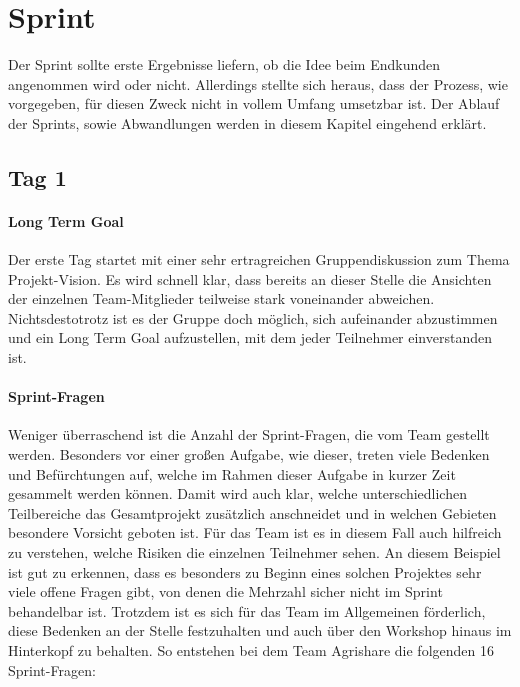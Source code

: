 \section{Sprint}
\label{sec:Sprint-Umsetzung}
Der Sprint sollte erste Ergebnisse liefern, ob die Idee beim Endkunden angenommen wird oder nicht. Allerdings stellte sich heraus, dass der Prozess, wie vorgegeben, für diesen Zweck nicht in vollem Umfang umsetzbar ist. Der Ablauf der Sprints, sowie Abwandlungen werden in diesem Kapitel eingehend erklärt.
\subsection*{\label{sec:Sprint-Umsetzung-Tag1}\thesubsection\quad Tag 1}
\paragraph{Long Term Goal}
Der erste Tag startet mit einer sehr ertragreichen Gruppendiskussion zum Thema Projekt-Vision. Es wird schnell klar, dass bereits an dieser Stelle die Ansichten der einzelnen Team-Mitglieder teilweise stark voneinander abweichen. Nichtsdestotrotz ist es der Gruppe doch möglich, sich aufeinander abzustimmen und ein Long Term Goal aufzustellen, mit dem jeder Teilnehmer einverstanden ist.
%
%
\paragraph{Sprint-Fragen}
Weniger überraschend ist die Anzahl der Sprint-Fragen, die vom Team gestellt werden. Besonders vor einer großen Aufgabe, wie dieser, treten viele Bedenken und Befürchtungen auf, welche im Rahmen dieser Aufgabe in kurzer Zeit gesammelt werden können. Damit wird auch klar, welche unterschiedlichen Teilbereiche das Gesamtprojekt zusätzlich anschneidet und in welchen Gebieten besondere Vorsicht geboten ist. Für das Team ist es in diesem Fall auch hilfreich zu verstehen, welche Risiken die einzelnen Teilnehmer sehen. An diesem Beispiel ist gut zu erkennen, dass es besonders zu Beginn eines solchen Projektes sehr viele offene Fragen gibt, von denen die Mehrzahl sicher nicht im Sprint behandelbar ist. Trotzdem ist es sich für das Team im Allgemeinen förderlich, diese Bedenken an der Stelle festzuhalten und auch über den Workshop hinaus im Hinterkopf zu behalten. So entstehen bei dem Team Agrishare die folgenden 16 Sprint-Fragen:

